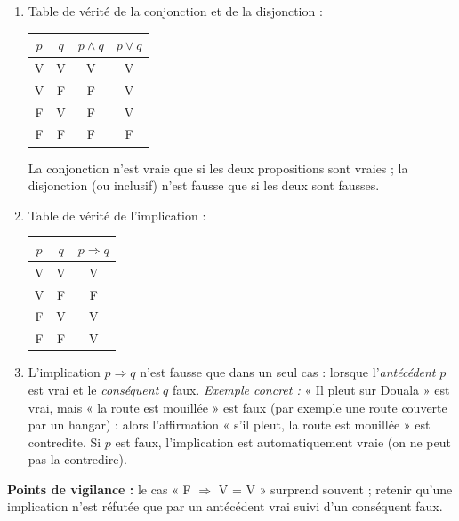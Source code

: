 \documentclass[11pt]{article}
\begin{document}
\begin{corrige}
\begin{enumerate}
\item Table de vérité de la conjonction et de la disjonction :
\begin{center}
\begin{tabular}{|c|c|c|c|}
\hline
\rowcolor{popblueL} $p$ & $q$ & $p \wedge q$ & $p \vee q$ \\
\hline
V & V & V & V \\
\hline
V & F & F & V \\
\hline
F & V & F & V \\
\hline
F & F & F & F \\
\hline
\end{tabular}
\end{center}
La conjonction n'est vraie que si les deux propositions sont vraies ; la disjonction (ou inclusif) n'est fausse que si les deux sont fausses.
\item Table de vérité de l'implication :
\begin{center}
\begin{tabular}{|c|c|c|}
\hline
\rowcolor{popblueL} $p$ & $q$ & $p \Rightarrow q$ \\
\hline
V & V & V \\
\hline
V & F & F \\
\hline
F & V & V \\
\hline
F & F & V \\
\hline
\end{tabular}
\end{center}
\item L'implication $p \Rightarrow q$ n'est fausse que dans un seul cas : lorsque l'\emph{antécédent} $p$ est vrai et le \emph{conséquent} $q$ faux. \emph{Exemple concret :} « Il pleut sur Douala » est vrai, mais « la route est mouillée » est faux (par exemple une route couverte par un hangar) : alors l'affirmation « s'il pleut, la route est mouillée » est contredite. Si $p$ est faux, l'implication est automatiquement vraie (on ne peut pas la contredire).
\end{enumerate}
\textbf{Points de vigilance :} le cas « F $\Rightarrow$ V = V » surprend souvent ; retenir qu'une implication n'est réfutée que par un antécédent vrai suivi d'un conséquent faux.
\end{corrige}
\end{document}
